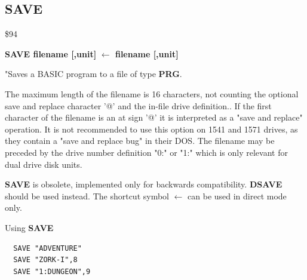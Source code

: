 \subsection{SAVE}
\begin{description}[leftmargin=2cm,style=nextline]
\item [Token:] \$94
\item [Format:] {\bf SAVE filename [,unit] }
                {\bf $\leftarrow$ filename [,unit] }
\item [Usage:]
   "Saves a BASIC program to a file of type {\bf PRG}.

   \filenamedefinition
   The maximum length of the filename is 16 characters,
   not counting the optional save and replace character '@'
   and the in-file drive definition..
   If the first character of the filename is an at sign '@' it
   is interpreted as a "save and replace" operation. It is not recommended
   to use this option on 1541 and 1571 drives, as they
   contain a "save and replace bug" in their DOS.
   The filename may be preceded by the drive number definition
   "0:" or "1:" which is only relevant for dual drive disk units.

   \unitdefinition

\item [Remarks:] {\bf SAVE} is obsolete, implemented only for backwards compatibility.
                 {\bf DSAVE} should be used instead.
                 The shortcut symbol {\bf $\leftarrow$} can be used in direct mode only.

\item [Example:] Using {\bf SAVE}
\begin{tcolorbox}[colback=black,coltext=white]
\verbatimfont{\codefont}
\begin{verbatim}
  SAVE "ADVENTURE"
  SAVE "ZORK-I",8
  SAVE "1:DUNGEON",9
\end{verbatim}
\end{tcolorbox}
\end{description}


\newpage
